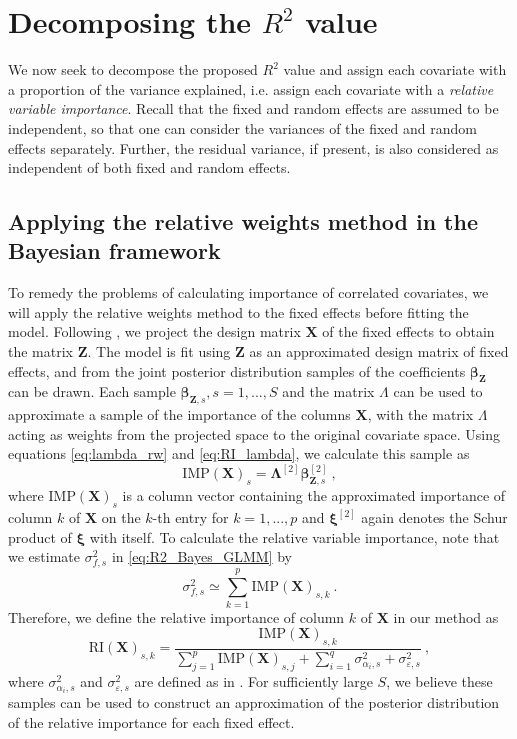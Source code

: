     
    


\section{Decomposing the \texorpdfstring{$R^2$}{Lg} value}
We now seek to decompose the proposed $R^2$ value and assign each covariate with a proportion of the variance explained, i.e. assign each covariate with a \textit{relative variable importance}. Recall that the fixed and random effects are assumed to be independent, so that one can consider the variances of the fixed and random effects separately. Further, the residual variance, if present, is also considered as independent of both fixed and random effects. 
\subsection{Applying the relative weights method in the Bayesian framework}
To remedy the problems of calculating importance of correlated covariates, we will apply the relative weights method to the fixed effects before fitting the model. Following , we project the design matrix $\mathbf{X}$ of the fixed effects to obtain the matrix $\mathbf{Z}$. The model is fit using $\mathbf{Z}$ as an approximated design matrix of fixed effects, and from the joint posterior distribution samples of the coefficients $\boldsymbol{\beta}_{\mathbf{Z}}$ can be drawn. Each sample $\boldsymbol{\beta}_{\mathbf{Z}, s}, s=1, ..., S$ and the matrix $\Lambda$ can be used to approximate a sample of the importance of the columns $\mathbf{X}$, with the matrix $\Lambda$ acting as weights from the projected space to the original covariate space. Using equations \eqref{eq:lambda_rw} and \eqref{eq:RI_lambda}, we calculate this sample as
\begin{equation}
    \text{IMP}(\mathbf{X})_s = \boldsymbol{\Lambda}^{[2]} \boldsymbol{\beta}_{\mathbf{Z}, s}^{[2]} \ ,
\end{equation}
where $\text{IMP}(\mathbf{X})_s$ is a column vector containing the approximated importance of column $k$ of $\mathbf{X}$ on the $k$-th entry for $k=1, ..., p$ and $\boldsymbol{\xi}^{[2]}$ again denotes the Schur product of $\boldsymbol{\xi}$ with itself. To calculate the relative variable importance, note that we estimate $\sigma^2_{f, s}$ in \eqref{eq:R2_Bayes_GLMM} by
\begin{equation}
    \sigma^2_{f, s} \simeq \sum_{k=1}^{p}\text{IMP}(\mathbf{X})_{s, k}  \ . 
\end{equation}
Therefore, we define the relative importance of column $k$ of $\mathbf{X}$ in our method as
\begin{equation}
    \label{eq:RI_X}
    \text{RI}(\mathbf{X})_{s, k} = \frac{\text{IMP}(\mathbf{X})_{s, k}}{\sum_{j=1}^{p}\text{IMP}(\mathbf{X})_{s, j} + \sum_{i=1}^q \sigma_{\alpha_i, s}^2 + \sigma_{\varepsilon, s}^2} \ ,
\end{equation}
where $\sigma_{\alpha_i, s}^2$ and  $\sigma_{\varepsilon, s}^2$ are defined as in .
For sufficiently large $S$, we believe these samples can be used to construct an approximation of the posterior distribution of the relative importance for each fixed effect. 


